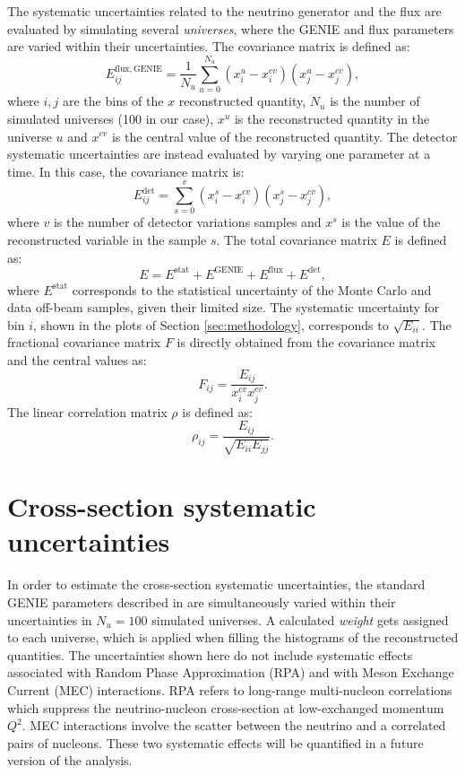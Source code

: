 The systematic uncertainties related to the neutrino generator and the flux are evaluated by simulating several \emph{universes}, where the GENIE and flux parameters are varied within their uncertainties. The covariance matrix is defined as:
\begin{equation}
    E_{ij}^{\mathrm{flux, GENIE}} = \frac{1}{N_{u}} \sum^{N_{u}}_{u=0} (x^{u}_{i} - x^{cv}_{i}) (x^{u}_{j} - x^{cv}_{j}),\label{eq:covariance}
\end{equation}
where $i,j$ are the bins of the $x$ reconstructed quantity, $N_{u}$ is the number of simulated universes (100 in our case), $x^{u}$ is the reconstructed quantity in the universe $u$ and $x^{cv}$ is the central value of the reconstructed quantity. 
The detector systematic uncertainties are instead evaluated by varying one parameter at a time. In this case, the covariance matrix is:
\begin{equation}
    E_{ij}^{\mathrm{det}} = \sum^{v}_{s=0} (x^{s}_{i} - x^{cv}_{i}) (x^{s}_{j} - x^{cv}_{j}),\label{eq:cov_det}
\end{equation}
where $v$ is the number of detector variations samples and $x^{s}$ is the value of the reconstructed variable in the sample $s$. The total covariance matrix $E$ is defined as:
\begin{equation}
    E = E^{\mathrm{stat}} + E^{\mathrm{GENIE}} + E^{\mathrm{flux}} + E^{\mathrm{det}},\label{eq:cov_tot}
\end{equation}
where $E^{\mathrm{stat}}$ corresponds to the statistical uncertainty of the Monte Carlo and data off-beam samples, given their limited size. 
The systematic uncertainty for bin $i$, shown in the plots of Section \ref{sec:methodology}, corresponds to $\sqrt{E_{ii}}$. The fractional covariance matrix $F$ is directly obtained from the covariance matrix and the central values as:
\begin{equation} 
    F_{ij} = \frac{E_{ij}}{x_{i}^{cv} x_{j}^{cv}}.
\end{equation}
The linear correlation matrix $\rho$ is defined as:
\begin{equation}
    \rho_{ij} = \frac{E_{ij}}{\sqrt{E_{ii}E_{jj}}}.
\end{equation}

\section{Cross-section systematic uncertainties}
In order to estimate the cross-section systematic uncertainties, the standard GENIE parameters described in \cite{Andreopoulos:2009rq} are simultaneously varied within their uncertainties in $N_{u} = 100$ simulated universes. A calculated \emph{weight} gets assigned to each universe, which is applied when filling the histograms of the reconstructed quantities. The uncertainties shown here do not include systematic effects associated with Random Phase Approximation (RPA) and with Meson Exchange Current (MEC) interactions. RPA refers to long-range multi-nucleon correlations which suppress the neutrino-nucleon cross-section at low-exchanged momentum $Q^2$. MEC interactions involve the scatter between the neutrino and a correlated pairs of nucleons. These two systematic effects will be quantified in a future version of the analysis.

